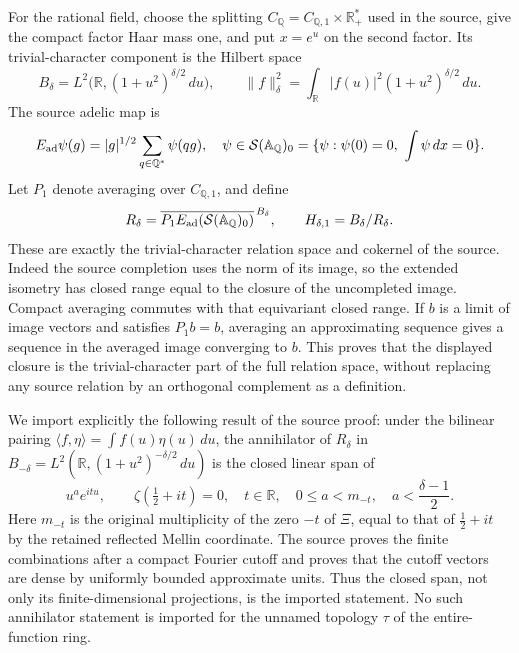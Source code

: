 For the rational field, choose the splitting
$C_{\mathbb Q}=C_{\mathbb Q,1}\times\mathbb R_+^*$ used in the source,
give the compact factor Haar mass one, and put $x=e^u$ on the second
factor. Its trivial-character component is the Hilbert space
\[
 B_\delta=L^2\bigl(\mathbb R,(1+u^2)^{\delta/2}\,du\bigr),
 \qquad
 \|f\|_\delta^2=\int_{\mathbb R}|f(u)|^2(1+u^2)^{\delta/2}\,du.
\]
The source adelic map is
\[
 E_{\rm ad}\psi(g)=|g|^{1/2}\sum_{q\in\mathbb Q^*}\psi(qg),
 \quad
 \psi\in\mathcal S(\mathbb A_{\mathbb Q})_0
 =\{\psi:\psi(0)=0,\ \int\psi\,dx=0\}.
\]
Let $P_1$ denote averaging over $C_{\mathbb Q,1}$, and define
\[
 R_\delta=\overline{P_1E_{\rm ad}
             (\mathcal S(\mathbb A_{\mathbb Q})_0)}^{\,B_\delta},
 \qquad H_{\delta,1}=B_\delta/R_\delta.
\]
These are exactly the trivial-character relation space and cokernel
of the source. Indeed the source completion uses the norm of its image,
so the extended isometry has closed range equal to the closure of the
uncompleted image. Compact averaging commutes with that equivariant
closed range. If $b$ is a limit of image vectors and satisfies $P_1b=b$,
averaging an approximating sequence gives a sequence in the averaged
image converging to $b$. This proves that the displayed closure is the
trivial-character part of the full relation space, without replacing
any source relation by an orthogonal complement as a definition.

We import explicitly the following result of the source proof:
under the bilinear pairing $\langle f,\eta\rangle=\int f(u)\eta(u)\,du$,
the annihilator of $R_\delta$ in
$B_{-\delta}=L^2(\mathbb R,(1+u^2)^{-\delta/2}\,du)$ is the closed
linear span of
\begin{equation}\label{eq:cq-sobolev-source-annihilator}
 u^a e^{itu},\qquad
 \zeta(\tfrac12+it)=0,\quad t\in\mathbb R,\quad
 0\leq a<m_{-t},\quad a<\frac{\delta-1}{2}.
\end{equation}
Here $m_{-t}$ is the original multiplicity of the zero $-t$ of
$\Xi$, equal to that of $\tfrac12+it$ by the retained reflected
Mellin coordinate. The source proves the finite combinations after a
compact Fourier cutoff and proves that the cutoff vectors are dense
by uniformly bounded approximate units. Thus the closed span, not
only its finite-dimensional projections, is the imported statement.
No such annihilator statement is imported for the unnamed topology
$\tau$ of the entire-function ring.


